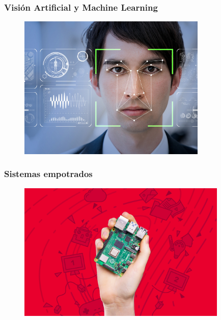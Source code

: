 \documentclass{beamer}
\begin{document}
\begin{frame}
\frametitle{Visión Artificial y Machine Learning}
\begin{figure}
    \centering
    \includegraphics[width=9cm]{figs/Apps-de-reconocimiento-facial-1.jpg}
\end{figure}
    
\end{frame}

\begin{frame}
\frametitle{Sistemas empotrados}
\begin{figure}
    \centering
    \includegraphics[width=10cm]{figs/raspberry_en_mano_rojo.png}
\end{figure}
    
\end{frame}

\end{document}
